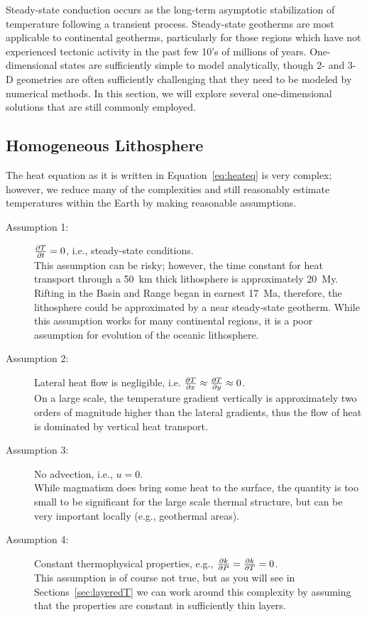 Steady-state conduction occurs as the long-term asymptotic stabilization of temperature following a transient process. Steady-state geotherms are most applicable to continental geotherms, particularly for those regions which have not experienced tectonic activity in the past few 10's of millions of years. One-dimensional states are sufficiently simple to model analytically, though 2- and 3-D geometries are often sufficiently challenging that they need to be modeled by numerical methods. In this section, we will explore several one-dimensional solutions that are still commonly employed.

\subsection{Homogeneous Lithosphere}

The heat equation as it is written in Equation~\ref{eq:heateq} is very complex; however, we reduce many of the complexities and still reasonably estimate temperatures within the Earth by making reasonable assumptions.
\begin{description}
  \item[Assumption 1:] $\pdv{T}{t} = 0$, i.e., steady-state conditions. \\ This assumption can be risky; however, the time constant for heat transport through a \SI{50}{km} thick lithosphere is approximately \SI{20}{My}.  Rifting in the Basin and Range began in earnest \SI{17}{Ma}, therefore, the lithosphere could be approximated by a near steady-state geotherm.  While this assumption works for many continental regions, it is a poor assumption for evolution of the oceanic lithosphere.

  \item[Assumption 2:] Lateral heat flow is negligible, i.e. $\pdv{T}{x}
  \approx \pdv{T}{y} \approx 0$. \\
  On a large scale, the temperature gradient vertically is approximately two orders of magnitude higher than the lateral gradients, thus the flow of heat is dominated by vertical heat transport.

  \item[Assumption 3:] No advection, i.e., $u = 0$. \\
  While magmatism does bring some heat to the surface, the quantity is too small to be significant for the large scale thermal structure, but can be very important locally (e.g., geothermal areas).

  \item[Assumption 4:] Constant thermophysical properties, e.g.,
  $\pdv{k}{P} = \pdv{k}{T} = 0$. \\
  This assumption is of course not true, but as you will see in Sections~\ref{sec:layeredT} we can work around this complexity by assuming that the properties are constant in sufficiently thin layers.
\end{description}

